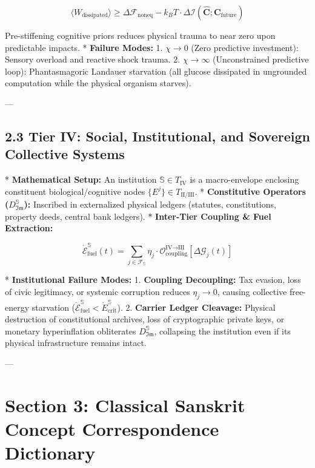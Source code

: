 \documentclass[11pt,a4paper]{article}
\theoremstyle{definition}
\theoremstyle{remark}
\begin{document}
\begin{equation}
\langle W_{\text{dissipated}} \rangle \ge \Delta \mathcal{F}_{\text{noneq}} - k_B T \cdot \Delta \mathcal{I}(\hat{\mathbf{C}}; \mathbf{C}_{\text{future}})
\end{equation}

  Pre-stiffening cognitive priors reduces physical trauma to near zero upon predictable impacts.
* \textbf{Failure Modes:}
  1. $\chi \to 0$ (Zero predictive investment): Sensory overload and reactive shock trauma.
  2. $\chi \to \infty$ (Unconstrained predictive loop): Phantasmagoric Landauer starvation (all glucose dissipated in ungrounded computation while the physical organism starves).

---

\subsection{2.3 Tier IV: Social, Institutional, and Sovereign Collective Systems}
* \textbf{Mathematical Setup:} An institution $\mathbb{S} \in T_{\text{IV}}$ is a macro-envelope enclosing constituent biological/cognitive nodes $\{E^j\} \in T_{\text{II/III}}$.
* \textbf{Constitutive Operators ($D_{\mathfrak{Im}}^{\mathbb{S}}$):} Inscribed in externalized physical ledgers (statutes, constitutions, property deeds, central bank ledgers).
* \textbf{Inter-Tier Coupling \& Fuel Extraction:}
  
\begin{equation}
\dot{\mathcal{E}}_{\text{fuel}}^{\mathbb{S}}(t) = \sum_{j \in \mathcal{F}_{\mathbb{S}}} \eta_j \cdot \mathcal{O}_{\text{coupling}}^{\text{IV} \to \text{III}}[ \Delta \mathcal{G}_j(t) ]
\end{equation}

* \textbf{Institutional Failure Modes:}
  1. \textbf{Coupling Decoupling:} Tax evasion, loss of civic legitimacy, or systemic corruption reduces $\eta_j \to 0$, causing collective free-energy starvation ($\dot{\mathcal{E}}_{\text{fuel}}^{\mathbb{S}} < \dot{E}_{\text{crit}}^{\mathbb{S}}$).
  2. \textbf{Carrier Ledger Cleavage:} Physical destruction of constitutional archives, loss of cryptographic private keys, or monetary hyperinflation obliterates $D_{\mathfrak{Im}}^{\mathbb{S}}$, collapsing the institution even if its physical infrastructure remains intact.

---

\section{Section 3: Classical Sanskrit Concept Correspondence Dictionary}
\end{document}
